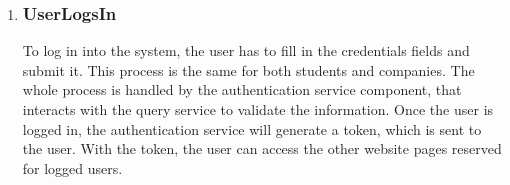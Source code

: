 \begin{enumerate}[label=\textbf{RV\arabic* -}]
\begin{figure}[H]
    \centering
\end{figure}

\item \subsubsection{UserLogsIn}

To log in into the system, the user has to fill in the credentials fields and submit it.
This process is the same for both students and companies.
The whole process is handled by the authentication service component, that interacts with the query service to validate the information.
Once the user is logged in, the authentication service will generate a token, which is sent to the user.
With the token, the user can access the other website pages reserved for logged users.

\begin{figure}[H]
    \centering
\end{figure}


\end{enumerate}
